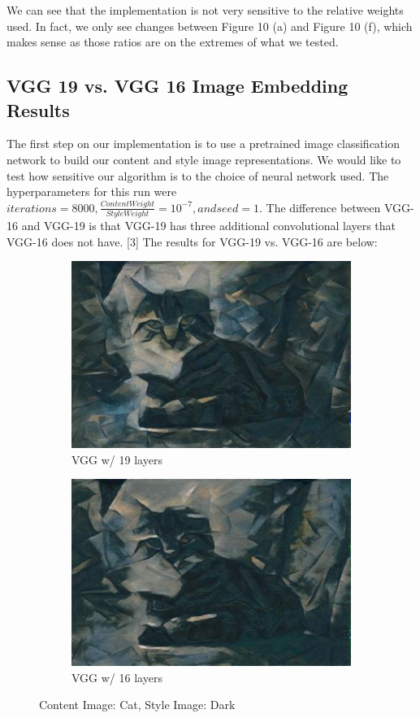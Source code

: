 \documentclass{article}
\begin{document}
\noindent We can see that the implementation is not very sensitive to the relative weights used. In fact, we only see changes between Figure 10 (a) and Figure 10 (f), which makes sense as those ratios are on the extremes of what we tested.

\subsection{VGG 19 vs. VGG 16 Image Embedding Results}

The first step on our implementation is to use a pretrained image classification network to build our content and style image representations. We would like to test how sensitive our algorithm is to the choice of neural network used. The hyperparameters for this run were $iterations = 8000, \frac{Content Weight}{Style Weight} = 10^{-7}, and seed = 1$. The difference between VGG-16 and VGG-19 is that VGG-19 has three additional convolutional layers that VGG-16 does not have. [3] The results for VGG-19 vs. VGG-16 are below:

\begin{figure}[H]
\begin{subfigure}{.5\textwidth}
  \centering
  \includegraphics[width=.8\linewidth]{cat_dark19}
  \caption{VGG w/ 19 layers}
  \label{fig:sfig1}
\end{subfigure}
\begin{subfigure}{.5\textwidth}
  \centering
  \includegraphics[width=.8\linewidth]{cat_dark16}
  \caption{VGG w/ 16 layers}
  \label{fig:sfig2}
\end{subfigure}
\caption{Content Image: Cat, Style Image: Dark}
\label{fig:fig}
\end{figure}
\end{document}
